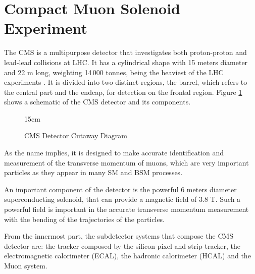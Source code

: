 \section{Compact Muon Solenoid Experiment}\label{sec:CMS}

The CMS is a multipurpose detector that investigates both proton-proton and lead-lead collisions at LHC. It has a cylindrical shape with 15 meters diameter and 22 m long, weighting 14\,000 tonnes, being the heaviest of the LHC experiments \cite{CMS:2008xjf}. It is divided into two distinct regions, the barrel, which refers to the central part and the endcap, for detection on the frontal region. Figure \ref{fig:cms_diagram} shows a schematic of the CMS detector and its components.

\begin{figure}[!htm]{15cm}
\caption{CMS Detector Cutaway Diagram}%
\label{fig:cms_diagram}
\end{figure}

As the name implies, it is designed to make accurate identification and measurement of the transverse momentum of muons, which are very important particles as they appear in many SM and BSM processes.

An important component of the detector is the powerful 6 meters diameter superconducting solenoid, that can provide a magnetic field of 3.8 T. Such a powerful field is important in the accurate transverse momentum measurement with the bending of the trajectories of the particles.

From the innermost part, the subdetector systems that compose the CMS detector are: the tracker composed by the silicon pixel and strip tracker, the electromagnetic calorimeter (ECAL), the hadronic calorimeter (HCAL) and the Muon system.

